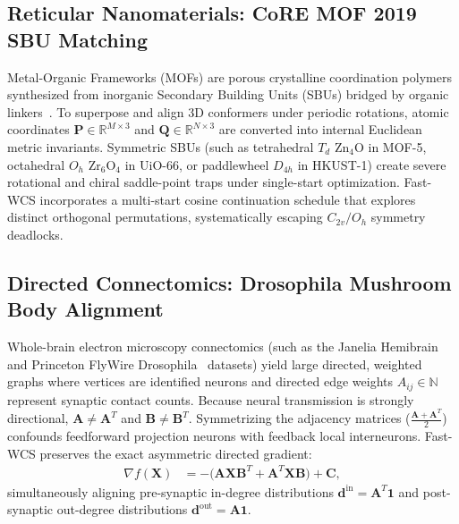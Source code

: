 \documentclass[a4paper,fleqn]{cas-dc}
\theoremstyle{thmstyleone}
\theoremstyle{thmstyletwo}
\theoremstyle{thmstylethree}
\begin{document}
\subsection{Reticular Nanomaterials: CoRE MOF 2019 SBU Matching}
Metal-Organic Frameworks (MOFs) are porous crystalline coordination polymers synthesized from inorganic Secondary Building Units (SBUs) bridged by organic linkers~\cite{chung2019}. To superpose and align 3D conformers under periodic rotations, atomic coordinates $\mathbf{P} \in \mathbb{R}^{M \times 3}$ and $\mathbf{Q} \in \mathbb{R}^{N \times 3}$ are converted into internal Euclidean metric invariants. Symmetric SBUs (such as tetrahedral $T_d$ $\mathrm{Zn}_4\mathrm{O}$ in MOF-5, octahedral $O_h$ $\mathrm{Zr}_6\mathrm{O}_4$ in UiO-66, or paddlewheel $D_{4h}$ in HKUST-1) create severe rotational and chiral saddle-point traps under single-start optimization. Fast-WCS incorporates a multi-start cosine continuation schedule that explores distinct orthogonal permutations, systematically escaping $C_{2v}/O_h$ symmetry deadlocks.

\subsection{Directed Connectomics: Drosophila Mushroom Body Alignment}
Whole-brain electron microscopy connectomics (such as the Janelia Hemibrain~\cite{scheffer2020} and Princeton FlyWire Drosophila~\cite{dorkenwald2024} datasets) yield large directed, weighted graphs where vertices are identified neurons and directed edge weights $A_{ij} \in \mathbb{N}$ represent synaptic contact counts. Because neural transmission is strongly directional, $\mathbf{A} \ne \mathbf{A}^T$ and $\mathbf{B} \ne \mathbf{B}^T$. Symmetrizing the adjacency matrices ($\frac{\mathbf{A}+\mathbf{A}^T}{2}$) confounds feedforward projection neurons with feedback local interneurons. Fast-WCS preserves the exact asymmetric directed gradient:
\begin{align}
\nabla f(\mathbf{X}) &= -\big(\mathbf{A}\mathbf{X}\mathbf{B}^T + \mathbf{A}^T\mathbf{X}\mathbf{B}\big) + \mathbf{C},
\label{eq:asymm_grad}
\end{align}
simultaneously aligning pre-synaptic in-degree distributions $\mathbf{d}^{\text{in}} = \mathbf{A}^T \mathbf{1}$ and post-synaptic out-degree distributions $\mathbf{d}^{\text{out}} = \mathbf{A}\mathbf{1}$.

\end{document}
